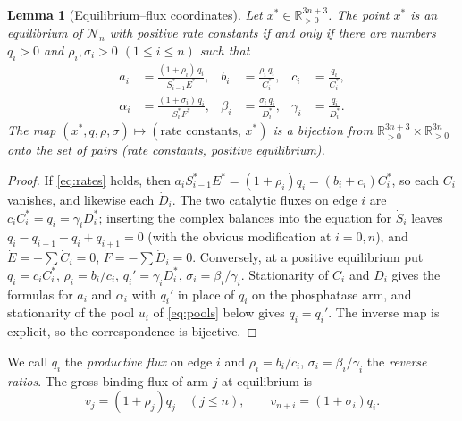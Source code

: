 \documentclass[11pt,a4paper]{article}
\theoremstyle{plain}
\newtheorem{lemma}[theorem]{Lemma}
\theoremstyle{definition}
\theoremstyle{remark}
\newcommand{\R}{\mathbb R}
\newcommand{\cN}{\mathcal N}
\begin{document}
\begin{lemma}[Equilibrium--flux coordinates]\label{lem:coords}
Let $x^*\in\R^{3n+3}_{>0}$. The point $x^*$ is an equilibrium of $\cN_n$ with positive rate constants if and only if there are numbers $q_i>0$ and $\rho_i,\sigma_i>0$ $(1\le i\le n)$ such that
\begin{equation}\label{eq:rates}
\begin{aligned}
 a_i&=\frac{(1+\rho_i)\,q_i}{S_{i-1}^*E^*},& b_i&=\frac{\rho_i\,q_i}{C_i^*},& c_i&=\frac{q_i}{C_i^*},\\
 \alpha_i&=\frac{(1+\sigma_i)\,q_i}{S_i^*F^*},& \beta_i&=\frac{\sigma_i\,q_i}{D_i^*},& \gamma_i&=\frac{q_i}{D_i^*}.
\end{aligned}
\end{equation}
The map $(x^*,q,\rho,\sigma)\mapsto(\text{rate constants},\,x^*)$ is a bijection from $\R^{3n+3}_{>0}\times\R^{3n}_{>0}$ onto the set of pairs (rate constants, positive equilibrium).
\end{lemma}
\begin{proof}
If \eqref{eq:rates} holds, then $a_iS_{i-1}^*E^*=(1+\rho_i)q_i=(b_i+c_i)C_i^*$, so each $\dot C_i$ vanishes, and likewise each $\dot D_i$. The two catalytic fluxes on edge $i$ are $c_iC_i^*=q_i=\gamma_iD_i^*$; inserting the complex balances into the equation for $\dot S_i$ leaves $q_i-q_{i+1}-q_i+q_{i+1}=0$ (with the obvious modification at $i=0,n$), and $\dot E=-\sum\dot C_i=0$, $\dot F=-\sum\dot D_i=0$. Conversely, at a positive equilibrium put $q_i=c_iC_i^*$, $\rho_i=b_i/c_i$, $q_i'=\gamma_iD_i^*$, $\sigma_i=\beta_i/\gamma_i$. Stationarity of $C_i$ and $D_i$ gives the formulas for $a_i$ and $\alpha_i$ with $q_i'$ in place of $q_i$ on the phosphatase arm, and stationarity of the pool $u_i$ of \eqref{eq:pools} below gives $q_i=q_i'$. The inverse map is explicit, so the correspondence is bijective.
\end{proof}
We call $q_i$ the \emph{productive flux} on edge $i$ and $\rho_i=b_i/c_i$, $\sigma_i=\beta_i/\gamma_i$ the \emph{reverse ratios}. The gross binding flux of arm $j$ at equilibrium is
\begin{equation}\label{eq:v}
 v_j=(1+\rho_j)q_j\quad(j\le n),\qquad v_{n+i}=(1+\sigma_i)q_i .
\end{equation}
\end{document}

